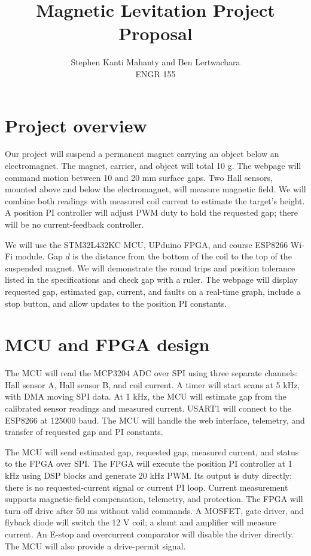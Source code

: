 \documentclass[11pt,letterpaper]{article}
\title{Magnetic Levitation Project Proposal}
\author{Stephen Kanti Mahanty and Ben Lertwachara\\ENGR 155}
\date{}
\begin{document}
\maketitle
\vspace{-1.4em}

\section{Project overview}
Our project will suspend a permanent magnet carrying an object below an
electromagnet. The magnet, carrier, and object will total 10 g. The webpage
will command motion between 10 and 20 mm surface gaps. Two Hall sensors,
mounted above and below the electromagnet, will measure magnetic field.
We will combine both readings with measured coil current to estimate the
target's height. A position PI controller will adjust PWM duty to hold the
requested gap; there will be no current-feedback controller.

We will use the STM32L432KC MCU, UPduino FPGA, and course ESP8266 Wi-Fi
module. Gap \(d\) is the distance from the bottom of the coil to the top of
the suspended magnet. We will demonstrate the round trips and position
tolerance listed in the specifications and check gap with a ruler. The
webpage will display requested gap, estimated gap, current, and faults on a
real-time graph, include a stop button, and allow updates to the position
PI constants.

\section{MCU and FPGA design}
The MCU will read the MCP3204 ADC over SPI using three separate channels:
Hall sensor A, Hall sensor B, and coil current. A timer will start scans at
5 kHz, with DMA moving SPI data. At 1 kHz, the MCU will estimate gap from
the calibrated sensor readings and measured current. USART1 will connect
to the ESP8266 at 125000 baud. The MCU will handle the web interface,
telemetry, and transfer of requested gap and PI constants.

The MCU will send estimated gap, requested gap, measured current, and status
to the FPGA over SPI. The FPGA will execute the position PI controller at
1 kHz using DSP blocks and generate 20 kHz PWM. Its output is duty directly;
there is no requested-current signal or current PI loop. Current measurement
supports magnetic-field compensation, telemetry, and protection. The FPGA
will turn off drive after 50 ms without valid commands. A MOSFET, gate
driver, and flyback diode will switch the 12 V coil; a shunt and amplifier
will measure current. An E-stop and overcurrent comparator will disable
the driver directly. The MCU will also provide a drive-permit signal.
\end{document}
